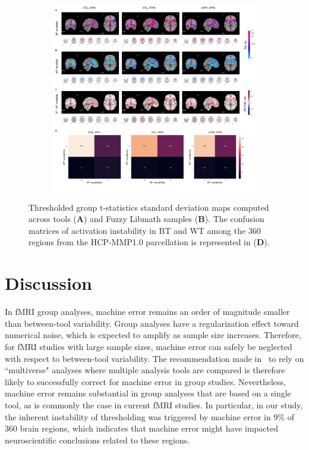 \documentclass[11pt,onecolumn]{article}
\begin{document}
  \begin{figure}[ht]
        \begin{subfigure}[ht]{\textwidth}
          \centering
          \includegraphics[width=\textwidth]{figures/std/gl-thresh.png}
          \end{subfigure}
        \centering
      \caption{Thresholded group t-statistics standard deviation maps
      computed across tools (\textbf{A}) and Fuzzy Libmath samples
      (\textbf{B}). The confusion matrices of activation instability
      in BT and WT among the 360 regions from the HCP-MMP1.0 parcellation is represented in (\textbf{D}).}
      \label{fig:thresh-maps}
    \end{figure}
  

\section{Discussion}

In fMRI group analyses, machine error remains an order of magnitude smaller
than between-tool variability. Group analyses have a regularization effect
toward numerical noise, which is expected to amplify as sample size
increases. Therefore, for fMRI studies with large sample sizes, machine
error can safely be neglected with respect to between-tool variability. The
recommendation made in~\cite{botvinik2020variability} to rely on
``multiverse" analyses where multiple analysis tools are compared is
therefore likely to successfully correct for machine error in group
studies. Nevertheless, machine error remains substantial in group analyses
that are based on a single tool, as is commonly the case in current fMRI
studies. In particular, in our study, the inherent instability of
thresholding was triggered by machine error in 9\% of 360 brain regions,
which indicates that machine error might have impacted neuroscientific
conclusions related to these regions. 
\end{document}
